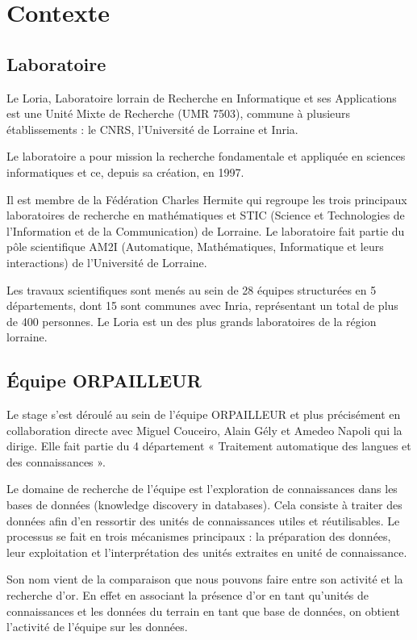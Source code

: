 \chapter{Contexte}

\section{Laboratoire}

Le Loria, Laboratoire lorrain de Recherche en Informatique et ses Applications est une Unité Mixte de Recherche (UMR 7503), commune à plusieurs établissements : le CNRS, l’Université de Lorraine et Inria.

\bigbreak

Le laboratoire a pour mission la recherche fondamentale et appliquée en sciences informatiques et ce, depuis sa création, en 1997.

\bigbreak

Il est membre de la Fédération Charles Hermite qui regroupe les trois principaux  laboratoires de recherche en mathématiques et STIC (Science et Technologies de l’Information et de la Communication) de Lorraine. Le laboratoire fait partie du pôle scientifique AM2I (Automatique, Mathématiques, Informatique et leurs interactions) de l’Université de Lorraine.

\bigbreak

Les travaux scientifiques sont menés au sein de 28 équipes structurées en 5 départements, dont 15 sont communes avec Inria, représentant un total de plus de 400 personnes. Le Loria est un des plus grands laboratoires de la région lorraine.

\section{Équipe ORPAILLEUR}

Le stage s'est déroulé au sein de l'équipe ORPAILLEUR et plus précisément en collaboration directe avec Miguel Couceiro, Alain Gély et Amedeo Napoli qui la dirige. Elle fait partie du 4 département « Traitement automatique des langues et des connaissances ». 

\bigbreak

Le domaine de recherche de l'équipe est l'exploration de connaissances dans les bases de données (knowledge discovery in databases). Cela consiste à traiter des données afin d'en ressortir des unités de connaissances utiles et réutilisables. Le processus se fait en trois mécanismes principaux : la préparation des données, leur exploitation et l'interprétation des unités extraites en unité de connaissance.

\bigbreak

Son nom vient de la comparaison que nous pouvons faire entre son activité et la recherche d'or. En effet en associant la présence d'or en tant qu'unités de connaissances et les données du terrain en tant que base de données, on obtient l'activité de l'équipe sur les données.